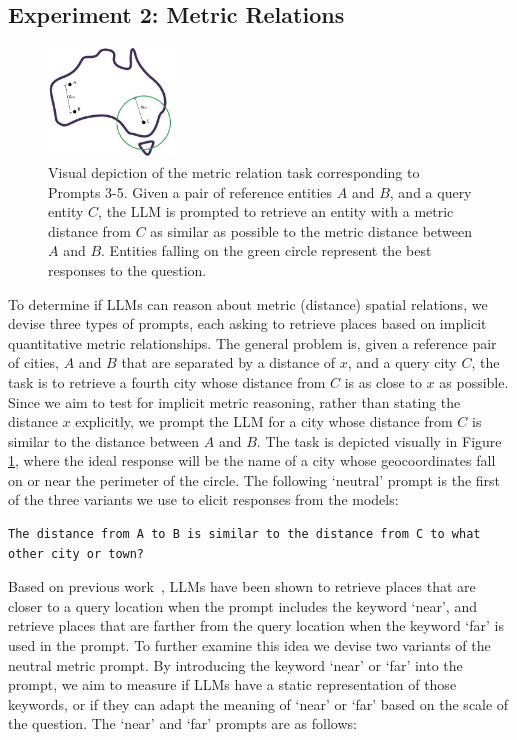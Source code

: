 \subsection{Experiment 2: Metric Relations}

\begin{figure}
    \centering
    \includegraphics[width=0.3\textwidth]{figures/metric_AUS_diagram.jpg}
    \caption{Visual depiction of the metric relation task corresponding to Prompts 3-5. Given a pair of reference entities $A$ and $B$, and a query entity $C$, the LLM is prompted to retrieve an entity with a metric distance from $C$ as similar as possible to the metric distance between $A$ and $B$. Entities falling on the green circle represent the best responses to the question.}
    \label{fig:metric-AUS-diagram}
\end{figure}

To determine if LLMs can reason about metric (distance) spatial relations, we devise three types of prompts, each asking to retrieve places based on implicit quantitative metric relationships.
%
The general problem is, given a reference pair of cities, $A$ and $B$ that are separated by a distance of $x$, and a query city $C$, the task is to retrieve a fourth city whose distance from $C$ is as close to $x$ as possible.
Since we aim to test for implicit metric reasoning, rather than stating the distance $x$ explicitly, we prompt the LLM for a city whose distance from $C$ is similar to the distance between $A$ and $B$.
The task is depicted visually in Figure \ref{fig:metric-AUS-diagram}, where the ideal response will be the name of a city whose geocoordinates fall on or near the perimeter of the circle.
The following `neutral' prompt is the first of the three variants we use to elicit responses from the models:

\begin{lstlisting}[title=Prompt 3: Neutral Metric Prompt]
    The distance from A to B is similar to the distance from C to what other city or town?
\end{lstlisting}

\noindent Based on previous work~\cite{Bhandari2023}, LLMs have been shown to retrieve places that are closer to a query location when the prompt includes the keyword `near', and retrieve places that are farther from the query location when the keyword `far' is used in the prompt.
To further examine this idea we devise two variants of the neutral metric prompt.
By introducing the keyword `near' or `far' into the prompt, we aim to measure if LLMs have a static representation of those keywords, or if they can adapt the meaning of `near' or `far' based on the scale of the question.
The `near' and `far' prompts are as follows:

